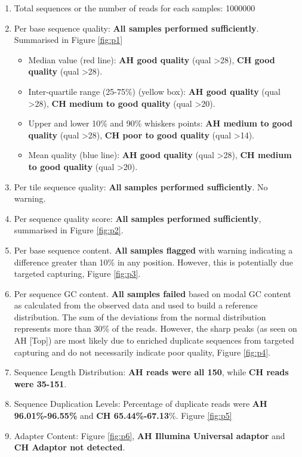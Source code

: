 \documentclass{article}
\begin{document}
\begin{enumerate}
\item Total sequences or the number of reads for each samples: 1000000
\item Per base sequence quality: \textbf{All samples performed sufficiently}. Summarised in Figure \ref{fig:p1}
	\begin{itemize}
	\item Median value (red line):
		 \textbf{AH good quality} (qual >28),
		 \textbf{CH good quality }(qual >28).

	\item Inter-quartile range (25-75\%) (yellow box): 
		 \textbf{AH good quality} (qual >28),
		\textbf{ CH medium to good quality}  (qual >20).

	\item Upper and lower 10\% and 90\% whiskers points:
		 \textbf{AH medium to good quality} (qual >28),
		 \textbf{CH poor to good quality} (qual >14).
	
	\item Mean quality (blue line):
		\textbf{AH good quality} (qual >28),
		\textbf{CH medium to good quality}  (qual >20).
	\end{itemize}

\item Per tile sequence quality: \textbf{All samples performed sufficiently}. No warning.
\item Per sequence quality score: \textbf{All samples performed sufficiently},  summarised in Figure \ref{fig:p2}.
\item Per base sequence content. \textbf{All samples flagged} with warning indicating 
a difference greater than 10\% in any position. However, this is potentially due targeted capturing, Figure \ref{fig:p3}.

\item Per sequence GC content. \textbf{All samples failed} based on modal GC content as calculated from the observed data and used to build a reference distribution. The sum of the deviations from the normal distribution represents more than 30\% of the reads.
However, the sharp peaks (as seen on AH [Top]) are most likely due to enriched duplicate sequences from targeted capturing and do not necessarily indicate poor quality, Figure \ref{fig:p4}.

\item Sequence Length Distribution:\textbf{ AH reads were all 150}, while \textbf{CH reads were 35-151}.
 
\item Sequence Duplication Levels: Percentage of duplicate reads were \textbf{AH 96.01\%-96.55\%} and \textbf{CH 65.44\%-67.13}\%. Figure \ref{fig:p5}

\item Adapter Content: Figure \ref{fig:p6},
	\textbf{AH Illumina Universal adaptor} and
	\textbf{CH Adaptor not detected}.
\end{enumerate}
\end{document}
